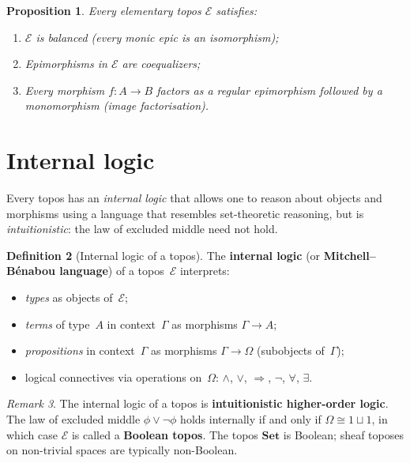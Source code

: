 \documentclass[a4paper,12pt]{book}
\newcommand{\Set}{\mathbf{Set}}
\theoremstyle{definition}
\newtheorem{definition}{Definition}[section]
\theoremstyle{plain}
\newtheorem{proposition}[definition]{Proposition}
\theoremstyle{remark}
\newtheorem{remark}[definition]{Remark}
\begin{document}
\begin{proposition}\label{prop:topos-properties}
Every elementary topos $\mathcal{E}$ satisfies:
\begin{enumerate}[label=(\alph*)]
\item $\mathcal{E}$ is balanced (every monic epic is an isomorphism);
\item Epimorphisms in $\mathcal{E}$ are coequalizers;
\item Every morphism $f\colon A\to B$ factors as a regular epimorphism
      followed by a monomorphism (image factorisation).
\end{enumerate}
\end{proposition}



\section{Internal logic}\label{sec:internal-logic}


Every topos has an \emph{internal logic} that allows one to reason about
objects and morphisms using a language that resembles set-theoretic
reasoning, but is \emph{intuitionistic}: the law of excluded middle need
not hold.

\begin{definition}[Internal logic of a topos]\label{def:internal-logic}
The \textbf{internal logic} (or \textbf{Mitchell--B\'enabou language})
of a topos~$\mathcal{E}$ interprets:
\begin{itemize}
\item \emph{types} as objects of~$\mathcal{E}$;
\item \emph{terms} of type~$A$ in context~$\Gamma$ as morphisms
      $\Gamma\to A$;
\item \emph{propositions} in context~$\Gamma$ as morphisms $\Gamma\to\Omega$
      (subobjects of~$\Gamma$);
\item logical connectives via operations on~$\Omega$:
      $\wedge$, $\vee$, $\Rightarrow$, $\neg$, $\forall$, $\exists$.
\end{itemize}
\end{definition}

\begin{remark}\label{rem:internal-logic-intuitionistic}
The internal logic of a topos is \textbf{intuitionistic higher-order logic}.
The law of excluded middle $\phi\vee\neg\phi$ holds internally if and only
if $\Omega\cong 1\sqcup 1$, in which case $\mathcal{E}$ is called a
\textbf{Boolean topos}.  The topos $\Set$ is Boolean; sheaf toposes on
non-trivial spaces are typically non-Boolean.
\end{remark}
\end{document}
